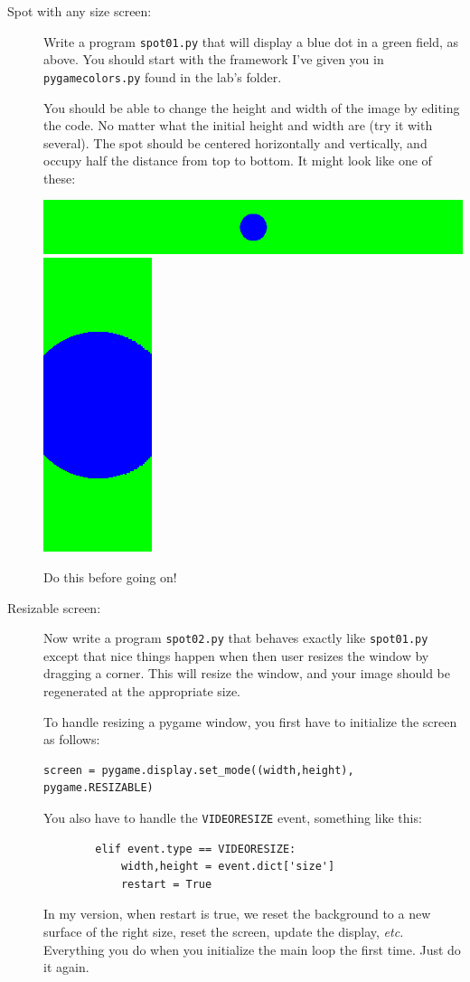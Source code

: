 \documentclass[12pt]{article}
\begin{document}
\begin{description}
\item[Spot with any size screen:]  
Write a program \lstinline{spot01.py}
that will display a blue dot in a green field, as above.
You should start with the framework I've given you in
\lstinline{pygamecolors.py} found in the lab's folder.

You should be able to change the height and width
of the image by editing the code.
No matter what the initial height and width are (try it
with several). The spot should be centered horizontally
and vertically, and occupy half the distance from top to
bottom.  It might look like one of these:


\includegraphics[scale=0.5]{spot02}\hfill
\includegraphics[scale=0.25]{spot03}

Do this before going on!

\item[Resizable screen:]  Now write a program
\lstinline{spot02.py} that behaves exactly like 
\lstinline{spot01.py} except that nice things happen
when then user resizes the window by dragging a corner.
This will resize the window, and your image should
be regenerated at the appropriate size.

To handle resizing a pygame window, you first
have to initialize the screen as follows:
\begin{lstlisting}
screen = pygame.display.set_mode((width,height), pygame.RESIZABLE)
\end{lstlisting}
You also have to handle
the \lstinline{VIDEORESIZE} event, something like this:
\begin{lstlisting}
        elif event.type == VIDEORESIZE:
            width,height = event.dict['size']
            restart = True
\end{lstlisting}
In my version, when restart is true,
we reset the  background to a new surface
of the right size, reset the screen,
update the display, {\em etc.}
Everything you do when you initialize 
the main loop the first time.  Just do it again.


\end{description}
\end{document}
